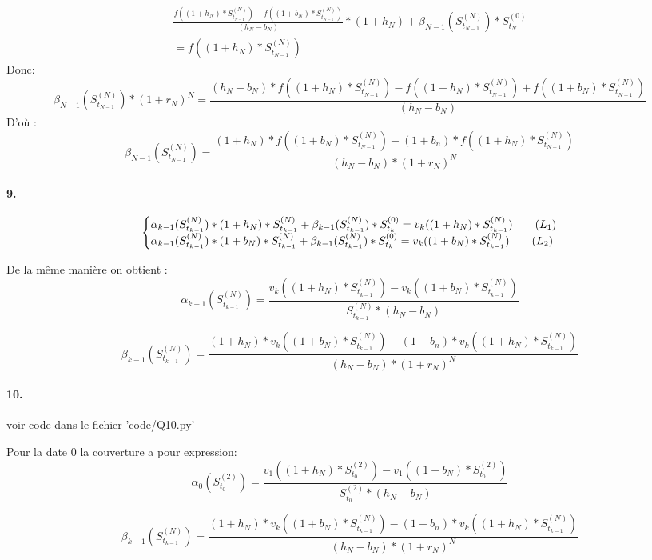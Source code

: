 \documentclass[10pt]{article}
\makeatletter
\newenvironment{sistema}%
{\left\lbrace\begin{array}{@{}l@{}}}%
  {\end{array}\right.}
\makeatother
\begin{document}
  \begin{align}
     \frac{f( (1+h_N)*S^{(N)}_{t_{N-1}}) - f( (1+b_N)*S^{(N)}_{t_{N-1}})}{(h_N - b_N)}*(1+h_N) + \beta_{N-1} (S^{(N)}_{t_{N-1}})*S^{(0)}_{t_{N}}\\
      = f( (1+h_N)*S^{(N)}_{t_{N-1}}) 
  \end{align}
  Donc:
  $$
  \beta_{N-1} (S^{(N)}_{t_{N-1}})*(1+r_N)^N = \frac{(h_N - b_N)*f( (1+h_N)*S^{(N)}_{t_{N-1}}) - f( (1+h_N)*S^{(N)}_{t_{N-1}}) + f( (1+b_N)*S^{(N)}_{t_{N-1}})}{(h_N - b_N)}
  $$
  D'où :
  $$
  \boxed{\beta_{N-1} (S^{(N)}_{t_{N-1}}) = \frac{(1+h_N)*f( (1+b_N)*S^{(N)}_{t_{N-1}}) - (1+b_n)*f( (1+h_N)*S^{(N)}_{t_{N-1}})}{(h_N - b_N)*(1+r_N)^N}}
  $$
  
  \paragraph{9.}
  $$
  \begin{sistema}
    \alpha_{k-1}(S^{(N)}_{t_{k-1}})*(1+h_N)*S^{(N)}_{t_{k-1}} + \beta_{k-1} (S^{(N)}_{t_{k-1}})*S^{(0)}_{t_{k}}=v_{k}( (1+h_N)*S^{(N)}_{t_{k-1}}) \quad \quad (L_1)\\
    \alpha_{k-1}(S^{(N)}_{t_{k-1}})*(1+b_N)*S^{(N)}_{t_{k-1}} + \beta_{k-1} (S^{(N)}_{t_{k-1}})*S^{(0)}_{t_{k}}=v_{k}( (1+b_N)*S^{(N)}_{t_{k-1}}) \quad \quad (L_2)
  \end{sistema}
  $$
  
  De la même manière on obtient :
  $$
    \boxed{\alpha_{k-1}(S^{(N)}_{t_{k-1}}) = \frac{v_{k}( (1+h_N)*S^{(N)}_{t_{k-1}}) - v_{k}( (1+b_N)*S^{(N)}_{t_{k-1}})}{S^{(N)}_{t_{k-1}} * (h_N - b_N)}}
  $$
  
  $$
    \boxed{\beta_{k-1} (S^{(N)}_{t_{k-1}}) = \frac{(1+h_N)*v_{k}( (1+b_N)*S^{(N)}_{t_{k-1}}) - (1+b_n)*v_{k}( (1+h_N)*S^{(N)}_{t_{k-1}})}{(h_N - b_N)*(1+r_N)^N}}
  $$
  
  \paragraph{10.} voir code dans le fichier 'code/Q10.py'
  
  Pour la date 0 la couverture a pour expression:
  $$
    \boxed{\alpha_{0}(S^{(2)}_{t_{0}}) = \frac{v_{1}( (1+h_N)*S^{(2)}_{t_{0}}) - v_{1}( (1+b_N)*S^{(2)}_{t_{0}})}{S^{(2)}_{t_{0}} * (h_N - b_N)}}
  $$
  
  $$
    \boxed{\beta_{k-1} (S^{(N)}_{t_{k-1}}) = \frac{(1+h_N)*v_{k}( (1+b_N)*S^{(N)}_{t_{k-1}}) - (1+b_n)*v_{k}( (1+h_N)*S^{(N)}_{t_{k-1}})}{(h_N - b_N)*(1+r_N)^N}}
  $$
  
\end{document}
